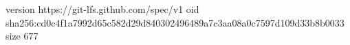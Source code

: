 version https://git-lfs.github.com/spec/v1
oid sha256:cd0c4f1a7992d65c582d29d840302496489a7c3aa08a0c7597d109d33b8b0033
size 677
